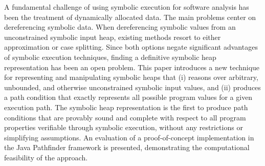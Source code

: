 A fundamental challenge of using symbolic execution for software analysis 
has been the treatment of dynamically allocated data. The main problems 
center on dereferencing symbolic data. When dereferencing symbolic values 
from an unconstrained symbolic input heap, existing methods resort to either 
approximation or case splitting. Since both options negate significant 
advantages of symbolic execution techniques, finding a definitive symbolic 
heap representation has been an open problem. This paper introduces a 
new technique for representing and manipulating symbolic heaps that (i) 
reasons over arbitrary, unbounded, and otherwise unconstrained symbolic 
input values, and (ii) produces a path condition that exactly represents all 
possible program values for a given execution path. The symbolic heap 
representation is the first to produce path conditions that are provably sound 
and complete with respect to all program properties verifiable through 
symbolic execution, without any restrictions or simplifying assumptions. An 
evaluation of a proof-of-concept implementation in the Java Pathfinder 
framework is presented, demonstrating the computational feasibility of the 
approach.

